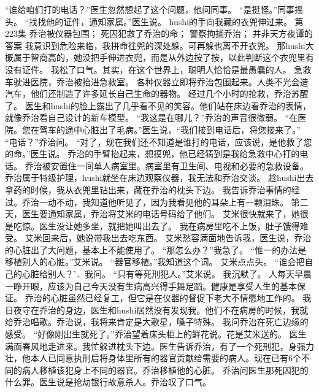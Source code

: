 \documentclass[a4paper,12pt,UTF8,twoside]{ctexbook}
\begin{document}
        “谁给咱们打的电话？”医生忽然想起了这个问题，他问同事。 
        “是挺怪。”同事摇头。 
        “找找他的证件，通知家属。”医生说。 
        hushi的手向我藏的衣兜伸过来。   第223集 
        乔治被仪器包围； 
        死囚犯救了乔治的命； 
        警察拘捕乔治； 
        并非天方夜谭的答案   
        我意识到危险来临，我拼命往兜的深处躲。可再躲也离不开衣兜。 
        那hushi大概属于智商高的，她没把手伸进衣兜，而是从外边按了按，以此判断这个衣兜里有没有证件。 
        我松了口气。其实，在这个世界上，聪明人恰恰是最愚蠢的人。 
        急救车驶进医院，乔治被抬进急救室。 
        各种仪器立即将乔治包围起来。人类不光会造汽车，他们还制造了许多延长自己生命的器物。 
        经过几个小时的抢救，乔治苏醒了。 
        医生和hushi的脸上露出了几乎看不见的笑容。他们站在床边看乔治的表情，就像乔治看自己设计的新车模型。 
        “我这是在哪儿？”乔治的声音很微弱。 
        “在医院。您在驾车的途中心脏出了毛病。”医生说，“我们接到电话后，将您接来了。” 
        “电话？”乔治问。 
        “对了，现在我们还不知道是谁打的电话，应该说，是他救了您的命。”医生说。 
        乔治的手臂抬起来，想摸兜，他已经猜到是我给急救中心打的电话。 
        乔治被安置住一间单人病室里。病室里有卫生间、电视和必要的急救设备。 
        乔治属于特级护理，hushi就坐在床边观察仪器，我无法和乔治交谈。 
        趁hushi出去拿药的时候，我从衣兜里钻出来，藏在乔治的枕头下边。 
        我告诉乔治事情的经过。乔治一动不动，我知道他听见了，因为我看见他的耳朵上有一颗泪珠。 
        第二天，医生要通知家属，乔治将艾米的电话号码给了他们。 
        艾米很快就来了，她很是吃惊。医生没让她多坐，就把她叫出去了。 
        我在病房里吃不上饭，肚子饿得难受。 
        艾米回来后，她说带我出去吃东西。 
        艾米愁容满面地告诉我，医生说，乔治的心脏出了大问题，基本上不能使用了。 
        “那怎么办？”我急了。 
        “惟一的办法是移植别人的心脏。”艾米说。 
        “器官移植。”我知道这个词。 
        艾米点点头。 
        “谁会把自己的心脏给别人？’．我问。 
        “只有等死刑犯人。”艾米说。 
        我沉默了。 
        人每天早晨一睁开眼，应该为自己今天没有生病高兴得手舞足蹈。健康是享受人生的基本保证。 
        乔治的心脏虽然已经复工，但它是在仪器的督促下老大不情愿地工作的。 
        我日夜守在乔治的身边，医生和hushi居然没有发现我。他们不在病房的时候，我就给乔治唱歌。乔治说，我将来肯定是大歌星，嗓子特殊。 
        我问乔治在死亡边缘的感受。 
        “好像刚出生就死了。”乔治望着床头柜上的鲜花说。花是艾米送的。 
        医生满面春风地走进来。我忙躲进枕头下边。医生告诉乔治，有了一个死刑犯，身强力壮，他本人已同意执刑后将身体里所有的器官贡献给需要的病人。现在已有6个不同的病人移植该犯身上不同的器官。乔治移植他的心脏。 
        乔治问医生那死囚犯的什么罪。医生说是抢劫银行故意杀人。乔治叹了口气。 
\end{document}
